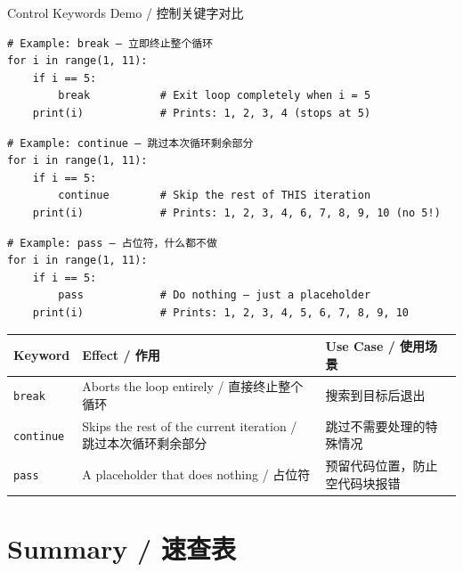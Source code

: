 \documentclass[11pt,a4paper]{report}
\let\oldtexttt\texttt
\renewcommand{\texttt}[1]{\textcolor{mainblue}{\oldtexttt{#1}}}
\begin{document}
\begin{examplebox}{Control Keywords Demo / 控制关键字对比}
\begin{lstlisting}
# Example: break — 立即终止整个循环
for i in range(1, 11):
    if i == 5:
        break           # Exit loop completely when i = 5
    print(i)            # Prints: 1, 2, 3, 4 (stops at 5)
\end{lstlisting}

\begin{lstlisting}
# Example: continue — 跳过本次循环剩余部分
for i in range(1, 11):
    if i == 5:
        continue        # Skip the rest of THIS iteration
    print(i)            # Prints: 1, 2, 3, 4, 6, 7, 8, 9, 10 (no 5!)
\end{lstlisting}

\begin{lstlisting}
# Example: pass — 占位符，什么都不做
for i in range(1, 11):
    if i == 5:
        pass            # Do nothing — just a placeholder
    print(i)            # Prints: 1, 2, 3, 4, 5, 6, 7, 8, 9, 10
\end{lstlisting}
\end{examplebox}

\medskip
\centering
\renewcommand{\arraystretch}{1.5}
\begin{tabular}{@{}lll@{}}
\toprule
\textbf{Keyword} & \textbf{Effect / 作用} & \textbf{Use Case / 使用场景} \\ \midrule
\texttt{break}    & Aborts the loop entirely / 直接终止整个循环 & 搜索到目标后退出 \\
\texttt{continue} & Skips the rest of the current iteration / 跳过本次循环剩余部分 & 跳过不需要处理的特殊情况 \\
\texttt{pass}     & A placeholder that does nothing / 占位符 & 预留代码位置，防止空代码块报错 \\ \bottomrule
\end{tabular}
\medskip

\section{Summary / 速查表}
\end{document}
